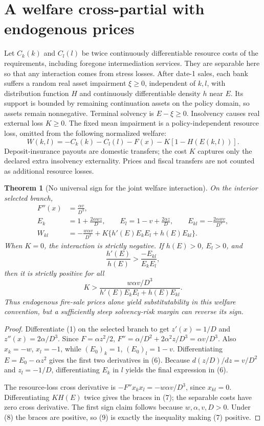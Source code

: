 \documentclass[11pt]{article}
\newtheorem{theorem}{Theorem}
\theoremstyle{remark}
\begin{document}
\section{A welfare cross-partial with endogenous prices}
Let $C_k(k)$ and $C_l(l)$ be twice continuously differentiable resource
costs of the requirements, including foregone intermediation services.
They are separable here so that any interaction comes from stress losses.
After date-1 sales, each bank suffers a random real asset impairment
$\xi\geq0$, independent of $k,l$, with distribution function $H$ and
continuously differentiable density $h$ near $E$. Its support is bounded
by remaining continuation assets on the policy domain, so assets remain
nonnegative. Terminal solvency is $E-\xi\geq0$. Insolvency causes real
external loss $K\geq0$. The fixed mean impairment is a policy-independent
resource loss, omitted from the following normalized welfare:
\[
 W(k,l)=-C_k(k)-C_l(l)-F(x)-K[1-H(E(k,l))]. \tag{4}
\]
Deposit-insurance payouts are domestic transfers; the cost $K$ captures
only the declared extra insolvency externality. Prices and fiscal transfers
are not counted as additional resource losses.

\begin{theorem}[No universal sign for the joint welfare interaction]
On the interior selected branch,
\begin{align}
 F''(x)&=\frac{\alpha v}{D^3},\tag{5}\\
 E_k&=1+\frac{2\alpha wz}{D},\qquad
 E_l=1-v+\frac{2\alpha z}{D},\qquad
 E_{kl}=-\frac{2\alpha wv}{D^3},\tag{6}\\
 W_{kl}&=-\frac{w\alpha v}{D^3}
 +K\{h'(E)E_kE_l+h(E)E_{kl}\}.\tag{7}
\end{align}
When $K=0$, the interaction is strictly negative. If $h(E)>0$,
$E_l>0$, and
\[
 \frac{h'(E)}{h(E)}>\frac{-E_{kl}}{E_kE_l}, \tag{8}
\]
then it is strictly positive for all
\[
 K>\frac{w\alpha v/D^3}
 {h'(E)E_kE_l+h(E)E_{kl}}. \tag{9}
\]
Thus endogenous fire-sale prices alone yield substitutability in this
welfare convention, but a sufficiently steep solvency-risk margin can
reverse its sign.
\end{theorem}
\begin{proof}
Differentiate (1) on the selected branch to get
$z'(x)=1/D$ and $z''(x)=2\alpha/D^3$.
Since $F=\alpha z^2/2$,
$F''=\alpha/D^2+2\alpha^2z/D^3=\alpha v/D^3$.
Also $x_k=-w$, $x_l=-1$, while
$(E_0)_k=1$, $(E_0)_l=1-v$. Differentiating
$E=E_0-\alpha z^2$ gives the first two derivatives in (6).
Because $d(z/D)/dz=v/D^2$ and $z_l=-1/D$, differentiating $E_k$
in $l$ yields the final expression in (6).

The resource-loss cross derivative is
$-F''x_kx_l=-w\alpha v/D^3$, since $x_{kl}=0$.
Differentiating $KH(E)$ twice gives the braces in (7); the separable
costs have zero cross derivative. The first sign claim follows because
$w,\alpha,v,D>0$. Under (8) the braces are positive, so (9) is exactly
the inequality making (7) positive.
\end{proof}
\end{document}
